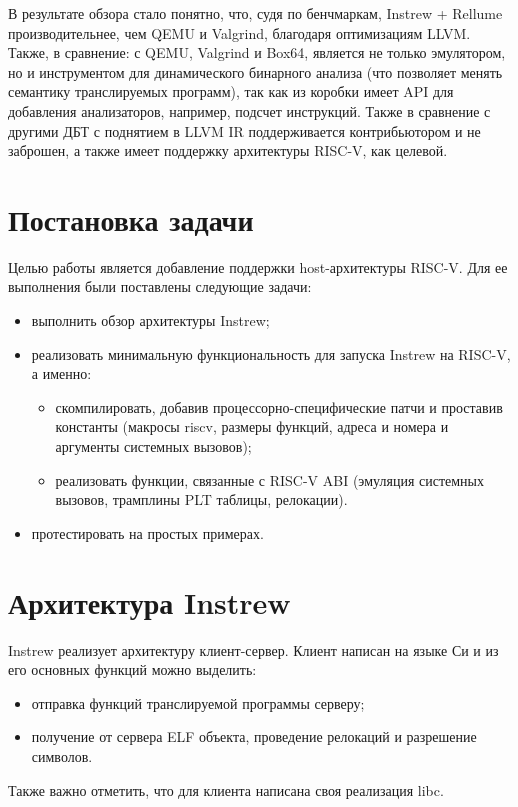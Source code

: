В результате обзора стало понятно, что, судя по бенчмаркам, Instrew + Rellume производительнее, чем QEMU и Valgrind, благодаря оптимизациям LLVM. Также, в сравнение: с QEMU, Valgrind и Box64, является не только эмулятором, но и инструментом для динамического бинарного анализа (что позволяет менять семантику транслируемых программ), так как из коробки имеет API для добавления анализаторов, например, подсчет инструкций.
Также в сравнение с другими ДБТ с поднятием в LLVM IR поддерживается контрибьютором и не заброшен, а также имеет поддержку архитектуры RISC-V, как целевой.

\section{Постановка задачи}
Целью работы является добавление поддержки host-архитектуры RISC-V. Для ее выполнения были поставлены следующие задачи:
\begin{itemize}
    \item выполнить обзор архитектуры Instrew;
    \item реализовать минимальную функциональность для запуска Instrew на RISC-V, а именно:
          \begin{itemize}
              \item скомпилировать, добавив процессорно-специфические патчи и проставив константы (макросы riscv, размеры функций, адреса и номера и аргументы системных вызовов);
              \item реализовать функции, связанные с RISC-V ABI (эмуляция системных вызовов, трамплины PLT таблицы, релокации).
          \end{itemize}
    \item протестировать на простых примерах.
\end{itemize}

\section{Архитектура Instrew}
Instrew реализует архитектуру клиент-сервер. Клиент написан на языке Си и из его основных функций можно выделить:
\begin{itemize}
    \item отправка функций транслируемой программы серверу;
    \item получение от сервера ELF объекта, проведение релокаций и разрешение символов.
\end{itemize}
Также важно отметить, что для клиента написана своя реализация libc.

